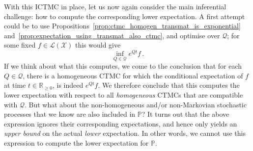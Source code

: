 \documentclass[graybox]{svmult}
\newcommand{\reals}{\mathbb{R}}
\newcommand{\realsnonneg}{\reals_{\geq 0}}
\newcommand{\states}{\mathcal{X}}
\newcommand{\gambles}{\mathcal{L}}
\newcommand{\gamblesX}{\gambles(\states)}
\begin{document}
With this ICTMC in place, let us now again consider the main inferential challenge: how to compute the corresponding lower expectation. A first attempt could be to use Propositions~\ref{prop:ctmc_homogen_transmat_is_exponential} and~\ref{prop:expectation_using_transmat_also_ctmc}, and optimise over $\mathcal{Q}$; for some fixed $f\in\gamblesX$ this would give
\begin{equation*}
\inf_{Q\in\mathcal{Q}} e^{Qt}f\,.
\end{equation*}
If we think about what this computes, we come to the conclusion that for each $Q\in\mathcal{Q}$, there is a homogeneous CTMC for which the conditional expectation of $f$ at time $t\in\realsnonneg$, is indeed $e^{Qt}f$. We therefore conclude that this computes the lower expectation with respect to all \emph{homogeneous} CTMCs that are compatible with $\mathcal{Q}$. But what about the non-homogeneous and/or non-Markovian stochastic processes that we know are also included in $\mathbb{P}$? It turns out that the above expression ignores their corresponding expectations, and hence only yields an \emph{upper bound} on the actual \emph{lower} expectation. In other words, we cannot use this expression to compute the lower expectation for $\mathbb{P}$.
\end{document}
